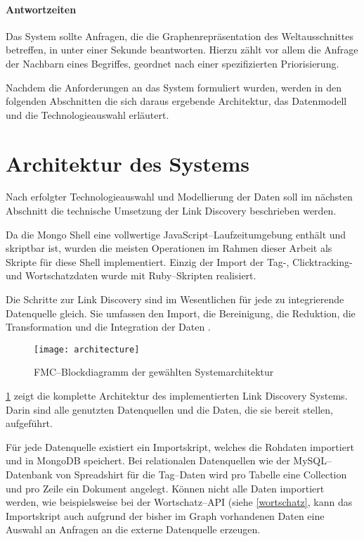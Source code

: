 \paragraph{Antwortzeiten} Das System sollte Anfragen, die die Graphenrepräsentation des Weltausschnittes betreffen, in unter einer Sekunde beantworten. Hierzu zählt vor allem die Anfrage der Nachbarn eines Begriffes, geordnet nach einer spezifizierten Priorisierung.

Nachdem die Anforderungen an das System formuliert wurden, werden in den folgenden Abschnitten die sich daraus ergebende Architektur, das Datenmodell und die Technologieauswahl erläutert.

\section{Architektur des Systems}

Nach erfolgter Technologieauswahl und Modellierung der Daten soll im nächsten Abschnitt die technische Umsetzung der Link Discovery beschrieben werden.

Da die Mongo Shell eine vollwertige JavaScript--Laufzeitumgebung enthält und skriptbar ist, wurden die meisten Operationen im Rahmen dieser Arbeit als Skripte für diese Shell implementiert. Einzig der Import der Tag-, Clicktracking- und Wortschatzdaten wurde mit Ruby--Skripten realisiert.

Die Schritte zur Link Discovery sind im Wesentlichen für jede zu integrierende Datenquelle gleich. Sie umfassen den Import, die Bereinigung, die Reduktion, die Transformation und die Integration der Daten \cite{hkp2012}.

\begin{figure}
\centering
\texttt{[image: architecture]}
\caption{FMC--Blockdiagramm der gewählten Systemarchitektur}
\label{fig:architecture}
\end{figure}

\cref{fig:architecture} zeigt die komplette Architektur des implementierten Link Discovery Systems. Darin sind alle genutzten Datenquellen und die Daten, die sie bereit stellen, aufgeführt.

Für jede Datenquelle existiert ein Importskript, welches die Rohdaten importiert und in MongoDB speichert. Bei relationalen Datenquellen wie der MySQL--Datenbank von Spreadshirt für die Tag--Daten wird pro Tabelle eine Collection und pro Zeile ein Dokument angelegt. Können nicht alle Daten importiert werden, wie beispielsweise bei der Wortschatz--API (siehe \cref{wortschatz}, kann das Importskript auch aufgrund der bisher im Graph vorhandenen Daten eine Auswahl an Anfragen an die externe Datenquelle erzeugen.

